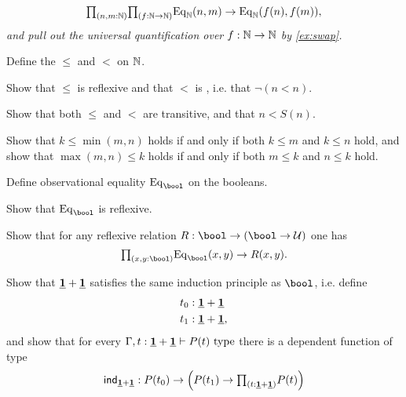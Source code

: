 \begin{exercises}
\begin{equation*}
\prd{n,m:\N}{f:\N\to\N} \mathrm{Eq}_\N(n,m)\to \mathrm{Eq}_\N(f(n),f(m)),
\end{equation*}
\emph{and pull out the universal quantification over $f:\mathbb{N}\to\mathbb{N}$ by \autoref{ex:swap}.}
\item 
  \begin{subexenum}
  \item Define the  $\leq$ and $<$ on $\mathbb{N}$.
  \item Show that $\leq$ is reflexive and that $<$ is , i.e. that $\neg(n<n)$. 
  \item Show that both $\leq$ and $<$ are transitive, and that $n<S(n)$.
  \item Show that $k\leq \min(m,n)$ holds if and only if both $k\leq m$ and $k\leq n$ hold, and show that $\max(m,n)\leq k$ holds if and only if both $m\leq k$ and $n\leq k$ hold.
\end{subexenum}
\item \label{ex:obs_bool}
\begin{subexenum}
\item Define observational equality $\mathrm{Eq}_\bool$ on the booleans.
\item Show that $\mathrm{Eq}_\bool$ is reflexive.
\item Show that for any reflexive relation $R:\bool\to(\bool\to \UU)$ one has
\begin{equation*}
\prd{x,y:\bool} \mathrm{Eq}_\bool(x,y)\to R(x,y).
\end{equation*}
\end{subexenum}
\item \label{ex:one_plus_one} Show that $\underline{\mathbf{1}}+\underline{\mathbf{1}}$ satisfies the same induction principle as $\bool$, i.e. define
\begin{align*}
t_0 & : \underline{\mathbf{1}} + \underline{\mathbf{1}} \\
t_1 & : \underline{\mathbf{1}} + \underline{\mathbf{1}},
\end{align*}
and show that for every $\Gamma,t:\underline{\mathbf{1}}+\underline{\mathbf{1}}\vdash P(t)~\mathrm{type}$ there is a dependent function of type
\begin{align*}
\ind{\unit+\unit}:P(t_0)\to \Big(P(t_1)\to \prd{t:\unit+\unit}P(t)\Big)
\end{align*}

\end{exercises}
